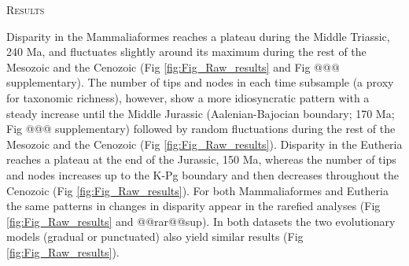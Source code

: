 \documentclass[12pt,letterpaper]{article}
\renewcommand{\section}[1]{%
\bigskip
\begin{center}
\begin{Large}
\normalfont\scshape #1
\medskip
\end{Large}
\end{center}}
\begin{document}

%
%

\section{Results}
Disparity in the Mammaliaformes reaches a plateau during the Middle Triassic, 240 Ma, and fluctuates slightly around its maximum during the rest of the Mesozoic and the Cenozoic (Fig \ref{fig:Fig_Raw_results} and Fig @@@ supplementary).
The number of tips and nodes in each time subsample (a proxy for taxonomic richness), however, show a more idiosyncratic pattern with a steady increase until the Middle Jurassic (Aalenian-Bajocian boundary; 170 Ma; Fig @@@ supplementary) followed by random fluctuations during the rest of the Mesozoic and the Cenozoic (Fig \ref{fig:Fig_Raw_results}).
Disparity in the Eutheria reaches a plateau at the end of the Jurassic, 150 Ma, whereas the number of tips and nodes increases up to the K-Pg boundary and then decreases throughout the Cenozoic (Fig \ref{fig:Fig_Raw_results}).
For both Mammaliaformes and Eutheria the same patterns in changes in disparity appear in the rarefied analyses (Fig \ref{fig:Fig_Raw_results} and @@rar@@sup).
In both datasets the two evolutionary models (gradual or punctuated) also yield similar results (Fig \ref{fig:Fig_Raw_results}).
\end{document}
